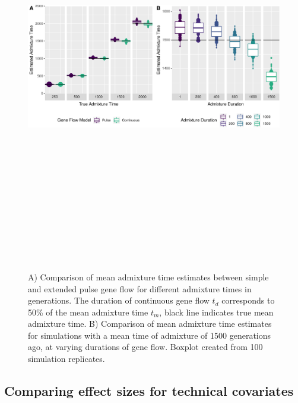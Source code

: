 \documentclass[]{article}
\begin{document}
\begin{figure}
\centering
\includegraphics[width=16cm,height=18cm,keepaspectratio]{Admixture_Time_Inference_Paper_Draft_files/figure-latex/fig2-1.pdf}
\caption{\label{fig:fig2} A) Comparison of mean admixture time estimates
between simple and extended pulse gene flow for different admixture times in generations.
The duration of continuous gene flow $t_d$ corresponds to 50\% of the mean
admixture time $t_m$, black line indicates true mean admixture time. B)
Comparison of mean admixture time estimates for simulations with a mean
time of admixture of 1500 generations ago, at varying durations of gene
flow. Boxplot created from 100 simulation replicates.}
\end{figure}


\subsection{Comparing effect sizes for technical covariates}\label{comparing effect sizes}
\end{document}
